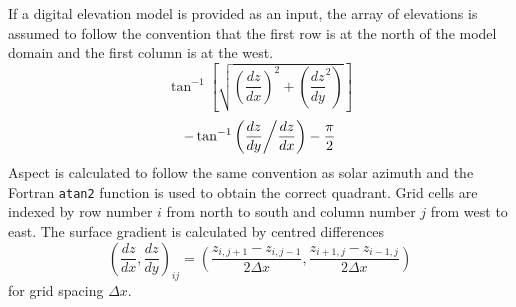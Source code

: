 \documentclass{article}
\begin{document}
If a digital elevation model is provided as an input, the array of elevations is assumed to follow the convention that the first row is at the north of the model domain and the first column is at the west. 
\begin{equation}
\tan^{-1}\left[\sqrt{\left(\frac{dz}{dx}\right)^2 + \left(\frac{dz}{dy}^2\right)}\right]
\end{equation}
\begin{equation}
- \tan^{-1}\left(\frac{dz}{dy}\middle/\frac{dz}{dx}\right) - \frac{\pi}{2}
\end{equation}
Aspect is calculated to follow the same convention as solar azimuth and the Fortran {\tt atan2} function is used to obtain the correct quadrant. Grid cells are indexed by row number $i$ from north to south and column number $j$ from west to east. The surface gradient is calculated by centred differences
\begin{equation}
\left(\frac{dz}{dx},\frac{dz}{dy}\right)_{ij} = 
\left(\frac{z_{i,j+1} - z_{i,j-1}}{2\Delta x}, \frac{z_{i+1,j} - z_{i-1,j}}{2\Delta x}\right)
\end{equation}
for grid spacing $\Delta x$.
\end{document}
